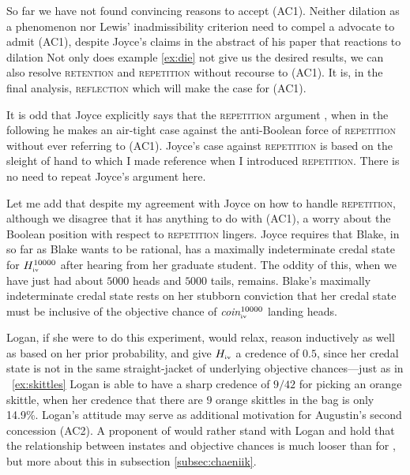 \documentclass[phd,12pt,oneside]{ubcthesis}
\begin{document}
So far we have not found convincing reasons to accept (AC1). Neither
dilation as a phenomenon nor Lewis' inadmissibility criterion need to
compel a {\anderson} advocate to admit (AC1), despite Joyce's claims
in the abstract of his paper that reactions to dilation  Not only does example
\ref{ex:die} not give us the desired results, we can also resolve
\textsc{retention} and \textsc{repetition} without recourse to (AC1).
It is, in the final analysis, \textsc{reflection} which will make the
case for (AC1).

It is odd that Joyce explicitly says that the \textsc{repetition}
argument  , when in the following he
makes an air-tight case against the anti-Boolean force of
\textsc{repetition} without ever referring to (AC1). Joyce's case
against \textsc{repetition} is based on the sleight of hand to which I
made reference when I introduced \textsc{repetition}. There is no need
to repeat Joyce's argument here.

Let me add that despite my agreement with Joyce on how to handle
\textsc{repetition}, although we disagree that it has anything to do
with (AC1), a worry about the Boolean position with respect to
\textsc{repetition} lingers. Joyce requires that Blake, in so far as
Blake wants to be rational, has a maximally indeterminate credal state
for $H^{10000}_{\mbox{\tiny{iv}}}$ after hearing from her graduate
student. The oddity of this, when we have just had about $5000$ heads
and $5000$ tails, remains. Blake's maximally indeterminate credal
state rests on her stubborn conviction that her credal state must be
inclusive of the objective chance of
\textit{coin}$^{10000}_{\mbox{\tiny{iv}}}$ landing heads.

Logan, if she were to do this experiment, would relax, reason
inductively as well as based on her prior probability, and give
$H_{\mbox{\tiny{iv}}}$ a credence of $0.5$, since her credal state is
not in the same straight-jacket of underlying objective chances---just
as in {\xample}~\ref{ex:skittles} Logan is able to have a sharp
credence of $9/42$ for picking an orange skittle, when her credence
that there are $9$ orange skittles in the bag is only 14.9\%. Logan's
attitude may serve as additional motivation for Augustin's second
concession (AC2). A proponent of {\augustin} would rather stand with
Logan and hold that the relationship between instates and objective
chances is much looser than for {\anderson}, but more about this in
subsection \ref{subsec:chaeniik}.
\end{document}
